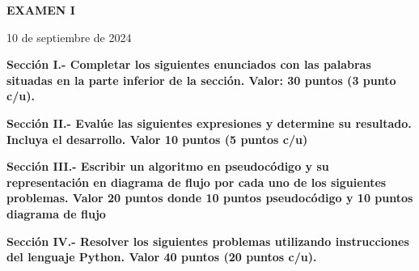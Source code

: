 \documentclass[10pt,addpoints]{exam}
\begin{document}
\begin{center}
  \sffamily\textbf{EXAMEN I}
\end{center}
\begin{flushright}
10 de septiembre de 2024
\end{flushright}

\begin{questions}
\begin{EnvFullwidth}
  \sffamily\textbf{Sección I.- Completar los siguientes enunciados con las
  palabras situadas en la parte inferior de la sección. Valor: 30 puntos
  (3 punto c/u).}
\end{EnvFullwidth}













\end{questions}

\begin{questions}
\begin{EnvFullwidth}
  \sffamily\textbf{Sección II.- Evalúe las siguientes expresiones y
  determine su resultado. Incluya el desarrollo. Valor 10 puntos (5 puntos
  c/u)}
\end{EnvFullwidth}





\end{questions}

\newpage

\begin{questions}
\begin{EnvFullwidth}
  \sffamily\textbf{Sección III.- Escribir un algoritmo en pseudocódigo y su
  representación en diagrama de flujo por cada uno de los siguientes
  problemas. Valor 20 puntos donde 10 puntos pseudocódigo y 10 puntos
  diagrama de flujo}
\end{EnvFullwidth}


%
%

\end{questions}

\begin{questions}
\begin{EnvFullwidth}
  \sffamily\textbf{Sección IV.- Resolver los siguientes problemas utilizando
  instrucciones del lenguaje Python. Valor 40 puntos (20 puntos c/u).}
\end{EnvFullwidth}



%

\end{questions}
\end{document}
